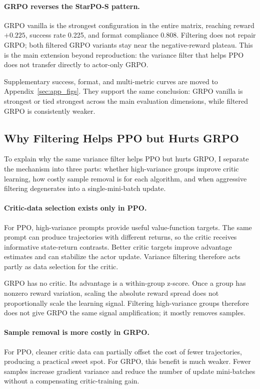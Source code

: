 \paragraph{GRPO reverses the StarPO-S pattern.}
GRPO vanilla is the strongest configuration in the entire matrix, reaching reward \(+0.225\), success rate 0.225, and format compliance 0.808. Filtering does not repair GRPO; both filtered GRPO variants stay near the negative-reward plateau. This is the main extension beyond reproduction: the variance filter that helps PPO does not transfer directly to actor-only GRPO.

Supplementary success, format, and multi-metric curves are moved to Appendix~\ref{sec:app_figs}. They support the same conclusion: GRPO vanilla is strongest or tied strongest across the main evaluation dimensions, while filtered GRPO is consistently weaker.

\subsection{Why Filtering Helps PPO but Hurts GRPO}

To explain why the same variance filter helps PPO but hurts GRPO, I separate the mechanism into three parts: whether high-variance groups improve critic learning, how costly sample removal is for each algorithm, and when aggressive filtering degenerates into a single-mini-batch update.

\paragraph{Critic-data selection exists only in PPO.}
For PPO, high-variance prompts provide useful value-function targets. The same prompt can produce trajectories with different returns, so the critic receives informative state-return contrasts. Better critic targets improve advantage estimates and can stabilize the actor update. Variance filtering therefore acts partly as data selection for the critic.

GRPO has no critic. Its advantage is a within-group z-score. Once a group has nonzero reward variation, scaling the absolute reward spread does not proportionally scale the learning signal. Filtering high-variance groups therefore does not give GRPO the same signal amplification; it mostly removes samples.

\paragraph{Sample removal is more costly in GRPO.}
For PPO, cleaner critic data can partially offset the cost of fewer trajectories, producing a practical sweet spot. For GRPO, this benefit is much weaker. Fewer samples increase gradient variance and reduce the number of update mini-batches without a compensating critic-training gain.

